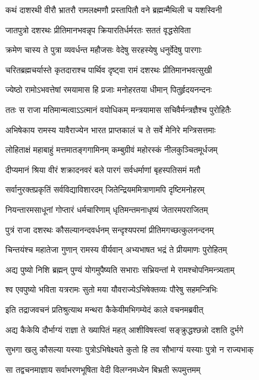\twolineshloka
{कथं दाशरथी वीरौ भ्रातरौ रामलक्ष्मणौ}
{प्रस्तापितौ वने ब्रह्मन्मैथिली च यशस्विनी}



\twolineshloka
{जातपुत्रो दशरथः प्रीतिमानभवन्नृप}
{क्रियारतिर्धर्मरतः सततं वृद्धसेविता}


\twolineshloka
{क्रमेण चास्य ते पुत्रा व्यवर्धन्त महौजसः}
{वेदेषु सरहस्येषु धनुर्वेदेषु पारगाः}


\twolineshloka
{चरितब्रह्मचर्यास्ते कृतदाराश्च पार्थिव}
{दृष्ट्वा रामं दशरथः प्रीतिमानभवत्सुखी}


\twolineshloka
{ज्येष्ठो रामोऽभवत्तेषां रमयामास हि प्रजाः}
{मनोहरतया धीमान् पितुर्हृदयनन्दनः}


\twolineshloka
{ततः स राजा मतिमान्मत्वाऽऽत्मानं वयोधिकम्}
{मन्त्रयामास सचिवैर्मन्त्रज्ञैश्च पुरोहितैः}


\twolineshloka
{अभिषेकाय रामस्य यावैराज्येन भारत}
{प्राप्तकालं च ते सर्वे मेनिरे मन्त्रिसत्तमाः}


\twolineshloka
{लोहिताक्षं महाबाहुं मत्तमातङ्गगामिनम्}
{कम्बुग्रीवं महोरस्कं नीलकुञ्चितमूर्धजम्}


\twolineshloka
{दीप्यमानं श्रिया वीरं शक्रादनवरं बले}
{पारगं सर्वधर्माणां बृहस्पतिसमं मतौ}


\twolineshloka
{सर्वानुरक्तप्रकृतिं सर्वविद्याविशारदम्}
{जितेन्द्रियममित्राणामपि दृष्टिमनोहरम्}


\twolineshloka
{नियन्तारमसाधूनां गोप्तारं धर्मचारिणाम्}
{धृतिमन्तमनाधृष्यं जेतारमपराजितम्}


\twolineshloka
{पुत्रं राजा दशरथः कौसल्यानन्दवर्धनम्}
{सन्दृश्यपरमां प्रीतिमगच्छत्कुलनन्दनम्}


\twolineshloka
{चिन्तयंश्च महातेजा गुणान् रामस्य वीर्यवान्}
{अभ्यभाषत भद्रं ते प्रीयमाणः पुरोहितम्}


\twolineshloka
{अद्य पुष्यो निशि ब्रह्मन् पुण्यं योगमुपैष्यति}
{सभाराः सभ्रियन्तां मे रामश्चोपनिमन्त्र्यताम्}


\twolineshloka
{श्व एवपुष्यो भविता यत्ररामः सुतो मया}
{यौवराज्येऽभिषेक्तव्यः पौरेषु सहमन्त्रिभिः}


\twolineshloka
{इति तद्राजवचनं प्रतिश्रुत्याथ मन्थरा}
{कैकेयीमभिगम्येदं काले वचनमब्रवीत्}


\twolineshloka
{अद्य कैकेयि दौर्भाग्यं राज्ञा ते ख्यापितं महत्}
{आशीविषस्त्वां सङ्क्रुद्धश्छन्नो दशति दुर्भगे}


\twolineshloka
{सुभगा खलु कौसल्या यस्याः पुत्रोऽभिषेक्ष्यते}
{कुतो हि तव सौभाग्यं यस्याः पुत्रो न राज्यभाक्}


\twolineshloka
{सा तद्वचनमाज्ञाय सर्वाभरणभूषिता}
{वेदी विलग्नमध्येन बिभ्रती रूपमुत्तमम्}


